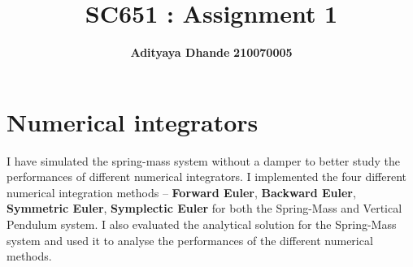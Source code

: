 \documentclass[11pt]{article}
\title{\textbf{SC651 : Assignment 1}}
\author{\textbf{Adityaya Dhande}   \hspace{8mm} \textbf{210070005}}
\date{}
\begin{document}
\maketitle
\section{Numerical integrators}
I have simulated the spring-mass system without a damper to better study the performances of different 
numerical integrators. I implemented the four different numerical integration methods -- \textbf{Forward Euler}, \textbf{Backward Euler},
\textbf{Symmetric Euler}, \textbf{Symplectic Euler} for both the Spring-Mass and Vertical Pendulum system. I also evaluated the analytical solution for
the Spring-Mass system and used it to analyse the performances of the different numerical methods. 
 
\end{document}
